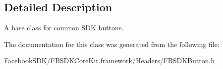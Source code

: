 \subsection{Detailed Description}
A base class for common S\-D\-K buttons. 

The documentation for this class was generated from the following file\-:\begin{DoxyCompactItemize}
\item 
Facebook\-S\-D\-K/\-F\-B\-S\-D\-K\-Core\-Kit.\-framework/\-Headers/F\-B\-S\-D\-K\-Button.\-h\end{DoxyCompactItemize}
